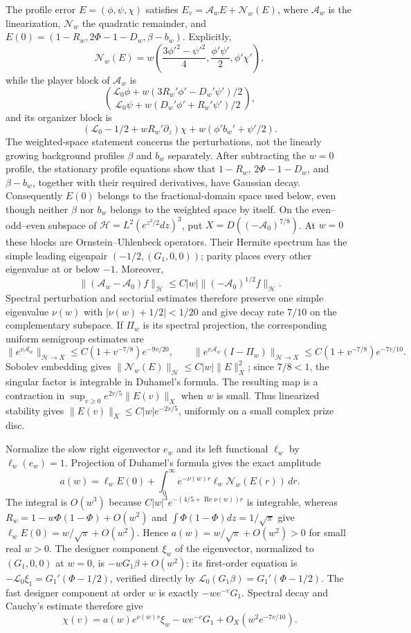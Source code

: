 \documentclass[mnsc]{informs3}
\begin{document}
\begin{APPENDICES}
{The profile error $E=(\phi,\psi,\chi)$ satisfies
$E_v=\mathcal A_wE+\mathcal N_w(E)$, where $\mathcal A_w$ is the
linearization, $\mathcal N_w$ the quadratic remainder, and
$E(0)=(1-R_w,2\Phi-1-D_w,\beta-b_w)$.
Explicitly,
\[
\mathcal N_w(E)=w\left(
\frac{3\phi'^2-\psi'^2}{4},\frac{\phi'\psi'}2,\phi'\chi'
\right),
\]
while the player block of $\mathcal A_w$ is
\[
\binom{\mathcal L_0\phi+
w(3R_w'\phi'-D_w'\psi')/2}
{\mathcal L_0\psi+w(D_w'\phi'+R_w'\psi')/2},
\]
and its organizer block is
\[
(\mathcal L_0-1/2+wR_w'\partial_z)\chi
+w(\phi'b_w'+\psi'/2).
\]
The weighted-space statement concerns the perturbations, not the
linearly growing background profiles $\beta$ and $b_w$ separately.
After subtracting the $w=0$ profile, the stationary profile equations
show that $1-R_w$, $2\Phi-1-D_w$, and $\beta-b_w$, together with their
required derivatives, have Gaussian decay. Consequently $E(0)$ belongs
to the fractional-domain space used below, even though neither $\beta$
nor $b_w$ belongs to the weighted space by itself.
On the even--odd--even subspace of
$\mathcal H=L^2(e^{z^2/2}dz)^3$, put $X=D((-\mathcal A_0)^{7/8})$.
At $w=0$ these blocks are Ornstein--Uhlenbeck operators. Their Hermite
spectrum has the simple leading eigenpair
$(-1/2,(G_1,0,0))$; parity places every other eigenvalue at or below
$-1$. Moreover,
\[
\|(\mathcal A_w-\mathcal A_0)f\|_{\mathcal H}
\leq C|w|\|(-\mathcal A_0)^{1/2}f\|_{\mathcal H}.
\]
Spectral perturbation \citep[][Chapter~VII, Sections~1--2]{Kato1980}
and sectorial estimates \citep[][Proposition~3.2.2 and Chapter~5]{LorenziEtAl2005}
therefore preserve one simple eigenvalue $\nu(w)$ with
$|\nu(w)+1/2|<1/20$ and give decay rate $7/10$ on the complementary
subspace. If $\Pi_w$ is its spectral projection, the corresponding
uniform semigroup estimates are
\[
\|e^{v\mathcal A_w}\|_{\mathcal H\to X}
\leq C(1+v^{-7/8})e^{-9v/20},\qquad
\|e^{v\mathcal A_w}(I-\Pi_w)\|_{\mathcal H\to X}
\leq C(1+v^{-7/8})e^{-7v/10}.
\]
Sobolev embedding gives $\|\mathcal N_w(E)\|_{\mathcal H}\leq C|w|\|E\|_X^2$;
since $7/8<1$, the singular factor is integrable in Duhamel's formula.
The resulting map is a contraction in
$\sup_{v\geq0}e^{2v/5}\|E(v)\|_X$ when $w$ is small. Thus
linearized stability \citep[][Theorem~7.1.3]{LorenziEtAl2005} gives
$\|E(v)\|_X\leq C|w|e^{-2v/5}$, uniformly on a small complex prize disc.

Normalize the slow right eigenvector $e_w$ and its left functional
$\ell_w$ by $\ell_w(e_w)=1$. Projection of Duhamel's formula gives the
exact amplitude
\[
a(w)=\ell_wE(0)+\int_0^\infty e^{-\nu(w)r}
\ell_w\mathcal N_w(E(r))\,dr.
\]
The integral is $O(w^3)$ because
$C|w|^3e^{-(4/5+\operatorname{Re}\nu(w))r}$ is integrable, whereas
$R_w=1-w\Phi(1-\Phi)+O(w^2)$ and
$\int\Phi(1-\Phi)dz=1/\sqrt\pi$ give
$\ell_wE(0)=w/\sqrt\pi+O(w^2)$. Hence
$a(w)=w/\sqrt\pi+O(w^2)>0$ for small real $w>0$.
The designer component $\xi_w$ of the eigenvector, normalized to
$(G_1,0,0)$ at $w=0$, is
$-wG_1\beta+O(w^2)$: its first-order equation is
$-\mathcal L_0\xi_1=G_1'(\Phi-1/2)$, verified directly by
$\mathcal L_0(G_1\beta)=G_1'(\Phi-1/2)$.
The fast designer component at order $w$ is exactly $-we^{-v}G_1$.
Spectral decay and Cauchy's estimate therefore give
\[
\chi(v)=a(w)e^{\nu(w)v}\xi_w-we^{-v}G_1
+O_X(w^2e^{-7v/10}).
\]

}
\end{APPENDICES}
\end{document}
